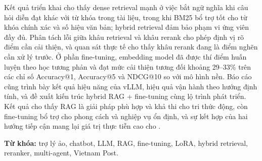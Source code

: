 Kết quả triển khai cho thấy dense retrieval mạnh ở việc bắt ngữ nghĩa khi câu hỏi diễn đạt
khác với từ khóa trong tài liệu, trong khi BM25 bổ trợ tốt cho từ khóa chính xác và số hiệu
văn bản; hybrid retrieval đảm bảo phạm vi ứng viên đầy đủ. Phân tách lỗi giữa khâu retrieval
và khâu rerank cho phép định vị rõ điểm cần cải thiện, và quan sát thực tế cho thấy khâu
rerank đang là điểm nghẽn cần xử lý trước. Ở phần fine-tuning, embedding model đã được thí điểm
huấn luyện theo học tương phản và đạt mức cải thiện tương đối khoảng 29--33\% trên các chỉ số
Accuracy@1, Accuracy@5 và NDCG@10 so với mô hình nền. Báo cáo cũng trình bày kết quả hiệu năng
của vLLM, hiệu quả vận hành theo hướng định tính, và đề xuất kiến trúc hybrid RAG + fine-tuning cùng
lộ trình phát triển. Kết quả cho thấy RAG là giải pháp phù hợp và khả thi cho tri thức
động, còn fine-tuning bổ trợ cho phong cách và nghiệp vụ ổn định, và sự kết hợp của hai
hướng tiếp cận mang lại giá trị thực tiễn cao cho \vnpost.

\vspace{0.4cm}
\noindent\textbf{Từ khóa:} trợ lý ảo, chatbot, LLM, RAG, fine-tuning, LoRA, hybrid
retrieval, reranker, multi-agent, Vietnam Post.

